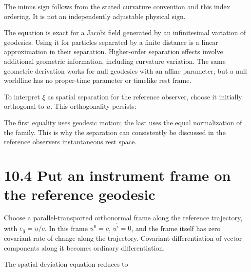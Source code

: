 \documentclass[
  11pt,
  letterpaper,
  oneside,
  openany]{scrbook}
\begin{document}
The minus sign follows from the stated curvature convention and this
index ordering. It is not an independently adjustable physical sign.

The equation is exact for a Jacobi field generated by an infinitesimal
variation of geodesics. Using it for particles separated by a finite
distance is a linear approximation in their separation. Higher-order
separation effects involve additional geometric information, including
curvature variation. The same geometric derivation works for null
geodesics with an affine parameter, but a null worldline has no
proper-time parameter or timelike rest frame.

To interpret \(\xi\) as spatial separation for the reference observer,
choose it initially orthogonal to \(u\). This orthogonality persists:

\begin{center}
\begingroup
{}
\ifdim\wd\grmathbox>\linewidth
\resizebox{\linewidth}{!}{\usebox{\grmathbox}}
\else\usebox{\grmathbox}\fi
\endgroup
\end{center}

The first equality uses geodesic motion; the last uses the equal
normalization of the family. This is why the separation can consistently
be discussed in the reference observer\textquotesingle s instantaneous
rest space.

\hypertarget{put-an-instrument-frame-on-the-reference-geodesic}{%
\section{10.4 Put an instrument frame on the reference
geodesic}\label{put-an-instrument-frame-on-the-reference-geodesic}}

Choose a parallel-transported orthonormal frame along the reference
trajectory, with \(e_{\hat0}=u/c\). In this frame \(u^{\hat0}=c\),
\(u^{\hat i}=0\), and the frame itself has zero covariant rate of change
along the trajectory. Covariant differentiation of vector components
along it becomes ordinary differentiation.

The spatial deviation equation reduces to
\end{document}
